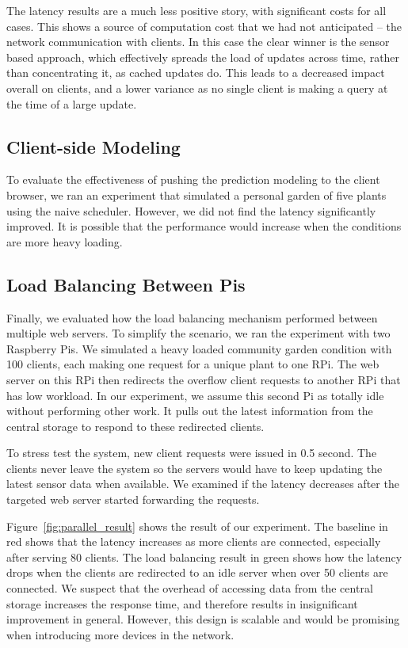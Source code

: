 \documentclass[a4paper]{acm_proc_article-sp}
\begin{document}
The latency results are a much less positive story, with significant costs for all cases.  This shows a source of computation cost that we had not anticipated -- the network communication with clients.  In this case the clear winner is the sensor based approach, which effectively spreads the load of updates across time, rather than concentrating it, as cached updates do.  This leads to a decreased impact overall on clients, and a lower variance as no single client is making a query at the time of a large update.

\subsection{Client-side Modeling}

To evaluate the effectiveness of pushing the prediction modeling to the client browser, we ran an experiment that simulated a personal garden of five plants using the naive scheduler.  However, we did not find the latency significantly improved. It is possible that the performance would increase when the conditions are more heavy loading.


\subsection{Load Balancing Between Pis}

Finally, we evaluated how the load balancing mechanism performed between multiple web servers. To simplify the scenario, we ran the experiment with two Raspberry Pis. We simulated a heavy loaded community garden condition with 100 clients, each making one request for a unique plant to one RPi. The web server on this RPi then redirects the overflow client requests to another RPi that has low workload. In our experiment, we assume this second Pi as totally idle without performing other work. It pulls out the latest information from the central storage to respond to these redirected clients. 

To stress test the system, new client requests were issued in 0.5 second. The clients never leave the system so the servers would have to keep updating the latest sensor data when available. We examined if the latency decreases after the targeted web server started forwarding the requests.

Figure~\ref{fig:parallel_result} shows the result of our experiment. The baseline in red shows that the latency increases as more clients are connected, especially after serving 80 clients. The load balancing result in green shows how the latency drops when the clients are redirected to an idle server when over 50 clients are connected. We suspect that the overhead of accessing data from the central storage increases the response time, and therefore results in insignificant improvement in general. However, this design is scalable and would be promising when introducing more devices in the network.
\end{document}
